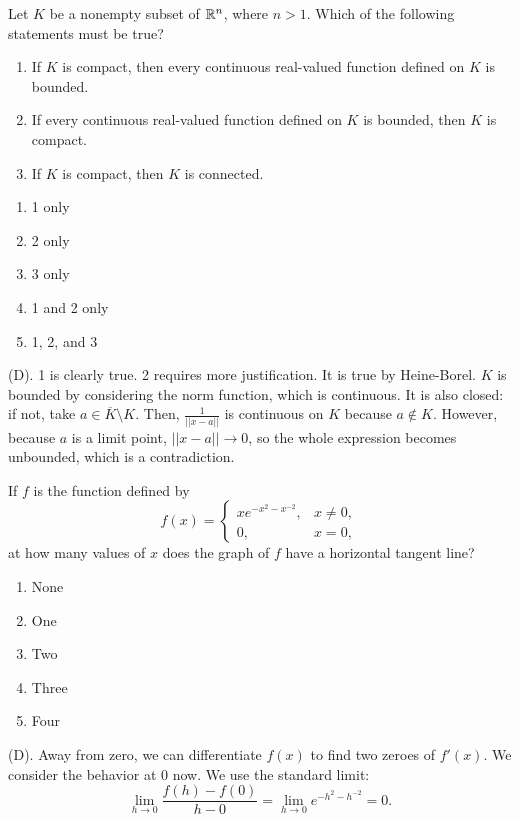 \begin{exercise}
Let $K$ be a nonempty subset of $\mathbb{R}^n$, where $n>1$. Which of the
following statements must be true?
\begin{enumerate}
    \item If $K$ is compact, then every continuous real-valued function
    defined on $K$ is bounded.
    \item If every continuous real-valued function defined on $K$ is
    bounded, then $K$ is compact.
    \item If $K$ is compact, then $K$ is connected.
\end{enumerate}
\begin{enumerate}[label=(\Alph*)]
    \item 1 only
    \item 2 only
    \item 3 only
    \item 1 and 2 only
    \item 1, 2, and 3
\end{enumerate}
\end{exercise}
\begin{solution}
(D). 1 is clearly true. 2 requires more justification. It is true by Heine-Borel. 
$K$ is bounded by  considering the norm function, which is continuous. It is also closed: 
if not, take $a \in \overline{K}\setminus K$. Then, $\frac{1}{||x - a||}$ 
is continuous on $K$ because $a \notin K$. However, because $a$ is a limit 
point, $||x - a|| \rightarrow 0$, so the whole expression becomes unbounded, which 
is a contradiction.
\end{solution}


\begin{exercise}
If $f$ is the function defined by
\[
f(x)=
\begin{cases}
xe^{-x^2-x^{-2}}, & x\neq0,\\
0, & x=0,
\end{cases}
\]
at how many values of $x$ does the graph of $f$ have a horizontal tangent line?
\begin{enumerate}[label=(\Alph*)]
    \item None
    \item One
    \item Two
    \item Three
    \item Four
\end{enumerate}
\end{exercise}
\begin{solution}
(D). Away from zero, we can differentiate $f(x)$ to find two zeroes
of $f'(x)$. We consider the behavior at $0$ now. We use the standard limit:
\[
\lim_{h \rightarrow 0} \frac{f(h) - f(0)}{h - 0} 
= \lim_{h \rightarrow 0} e^{-h^2 - h^{-2}}
= 0.
\]
\end{solution}

